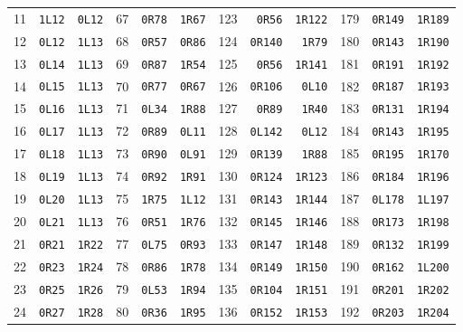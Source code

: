 \begin{center}
\begin{tabular}{rrr@{\hspace{5mm}}rrr@{\hspace{5mm}}rrr@{\hspace{5mm}}rrr}
11 & \texttt{1L12} & \texttt{0L12} & 67 & \texttt{0R78} & \texttt{1R67} & 123 & \texttt{0R56} & \texttt{1R122} & 179 & \texttt{0R149} & \texttt{1R189} \\
12 & \texttt{0L12} & \texttt{1L13} & 68 & \texttt{0R57} & \texttt{0R86} & 124 & \texttt{0R140} & \texttt{1R79} & 180 & \texttt{0R143} & \texttt{1R190} \\
13 & \texttt{0L14} & \texttt{1L13} & 69 & \texttt{0R87} & \texttt{1R54} & 125 & \texttt{0R56} & \texttt{1R141} & 181 & \texttt{0R191} & \texttt{1R192} \\
14 & \texttt{0L15} & \texttt{1L13} & 70 & \texttt{0R77} & \texttt{0R67} & 126 & \texttt{0R106} & \texttt{0L10} & 182 & \texttt{0R187} & \texttt{1R193} \\
15 & \texttt{0L16} & \texttt{1L13} & 71 & \texttt{0L34} & \texttt{1R88} & 127 & \texttt{0R89} & \texttt{1R40} & 183 & \texttt{0R131} & \texttt{1R194} \\
16 & \texttt{0L17} & \texttt{1L13} & 72 & \texttt{0R89} & \texttt{0L11} & 128 & \texttt{0L142} & \texttt{0L12} & 184 & \texttt{0R143} & \texttt{1R195} \\
17 & \texttt{0L18} & \texttt{1L13} & 73 & \texttt{0R90} & \texttt{0L91} & 129 & \texttt{0R139} & \texttt{1R88} & 185 & \texttt{0R195} & \texttt{1R170} \\
18 & \texttt{0L19} & \texttt{1L13} & 74 & \texttt{0R92} & \texttt{1R91} & 130 & \texttt{0R124} & \texttt{1R123} & 186 & \texttt{0R184} & \texttt{1R196} \\
19 & \texttt{0L20} & \texttt{1L13} & 75 & \texttt{1R75} & \texttt{1L12} & 131 & \texttt{0R143} & \texttt{1R144} & 187 & \texttt{0L178} & \texttt{1L197} \\
20 & \texttt{0L21} & \texttt{1L13} & 76 & \texttt{0R51} & \texttt{1R76} & 132 & \texttt{0R145} & \texttt{1R146} & 188 & \texttt{0R173} & \texttt{1R198} \\
21 & \texttt{0R21} & \texttt{1R22} & 77 & \texttt{0L75} & \texttt{0R93} & 133 & \texttt{0R147} & \texttt{1R148} & 189 & \texttt{0R132} & \texttt{1R199} \\
22 & \texttt{0R23} & \texttt{1R24} & 78 & \texttt{0R86} & \texttt{1R78} & 134 & \texttt{0R149} & \texttt{1R150} & 190 & \texttt{0R162} & \texttt{1L200} \\
23 & \texttt{0R25} & \texttt{1R26} & 79 & \texttt{0L53} & \texttt{1R94} & 135 & \texttt{0R104} & \texttt{1R151} & 191 & \texttt{0R201} & \texttt{1R202} \\
24 & \texttt{0R27} & \texttt{1R28} & 80 & \texttt{0R36} & \texttt{1R95} & 136 & \texttt{0R152} & \texttt{1R153} & 192 & \texttt{0R203} & \texttt{1R204} \\

\end{tabular}
\end{center}
